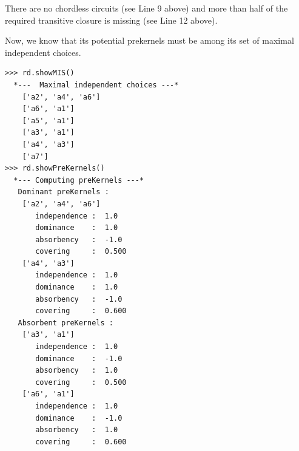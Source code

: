 There are no chordless circuits (see Line 9 above) and more than half of the required transitive closure is missing (see Line 12 above).

Now, we know that its potential prekernels must be among its set of maximal independent choices. 
\begin{lstlisting}[caption={Inspecting the prekernels of random digraph \texttt{rd}},label=list:17.11]
>>> rd.showMIS()
  *---  Maximal independent choices ---*
    ['a2', 'a4', 'a6']
    ['a6', 'a1']
    ['a5', 'a1']
    ['a3', 'a1']
    ['a4', 'a3']
    ['a7']
>>> rd.showPreKernels()
  *--- Computing preKernels ---*
   Dominant preKernels :
    ['a2', 'a4', 'a6']
       independence :  1.0
       dominance    :  1.0
       absorbency   :  -1.0
       covering     :  0.500
    ['a4', 'a3']
       independence :  1.0
       dominance    :  1.0
       absorbency   :  -1.0
       covering     :  0.600
   Absorbent preKernels :
    ['a3', 'a1']
       independence :  1.0
       dominance    :  -1.0
       absorbency   :  1.0
       covering     :  0.500
    ['a6', 'a1']
       independence :  1.0
       dominance    :  -1.0
       absorbency   :  1.0
       covering     :  0.600
\end{lstlisting}
     
